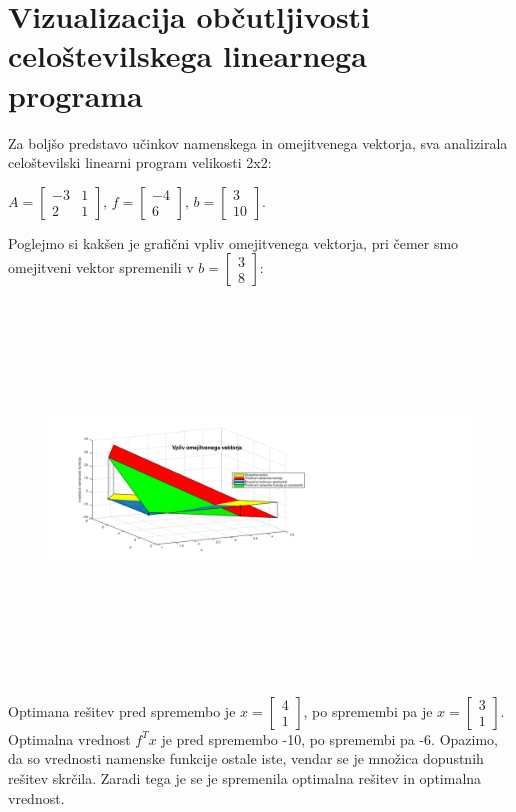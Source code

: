 \documentclass[a4paper,12pt]{article}
\begin{document}
\clearpage

\section{Vizualizacija občutljivosti celoštevilskega linearnega programa}

Za boljšo predstavo učinkov namenskega in omejitvenega vektorja, sva analizirala celoštevilski linearni program velikosti 2x2:
\begin{center}
$ A = \begin{bmatrix}
  -3 & 1  \\
  2 & 1   
\end{bmatrix} $, $f=\begin{bmatrix} -4 \\ 6\end{bmatrix}$, $b=\begin{bmatrix} 3 \\ 10 \end{bmatrix}.$
\\[0.5cm]
\end{center}

Poglejmo si kakšen je grafični vpliv omejitvenega vektorja, pri čemer smo omejitveni vektor spremenili v $b=\begin{bmatrix} 3 \\ 8\end{bmatrix}$:

\begin{figure}[h!]
\includegraphics[width=20cm,height=10cm]{viz1.png}
\centering
\end{figure}
Optimana rešitev pred spremembo je $x=\begin{bmatrix} 4 \\ 1 \end{bmatrix}$, po spremembi pa je $x=\begin{bmatrix} 3 \\ 1\end{bmatrix}$. Optimalna vrednost $f^Tx$ je pred spremembo -10, po spremembi pa -6. Opazimo, da so vrednosti namenske funkcije ostale iste, vendar se je množica dopustnih rešitev skrčila. Zaradi tega je se je spremenila optimalna rešitev in optimalna vrednost.
\end{document}
